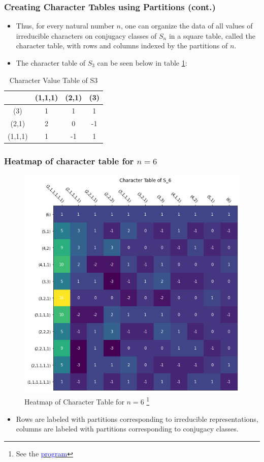 \documentclass{beamer}
\begin{document}
\begin{frame}
\frametitle{Creating Character Tables using Partitions (cont.)}
\begin{itemize}
    \item Thus, for every natural number $n$, one can organize the data of all values of irreducible characters on conjugacy classes of $S_{n}$ in a square table, called the character table, with rows and columns indexed by the partitions of $n$. 
    \item The character table of $S_{3}$ can be seen below in table \ref{tab:s3}:
\end{itemize}

\begin{table}[htbp]
    \centering
    \label{tab:s3}
    \begin{tabular}{c|c c c}
        & (1,1,1) & (2,1) & (3) \\
        \hline
        (3) & 1 & 1 & 1 \\
        (2,1) & 2 & 0 & -1 \\
        (1,1,1) & 1 & -1 & 1 \\
    \end{tabular}
    \caption{Character Value Table of S3}
\end{table}
\end{frame}

\begin{frame}
\frametitle{Heatmap of character table for $n=6$}

\begin{figure}[H]
  \centering
  \includegraphics[width=0.4\linewidth]{char_table_6_heatmap.png}
  \caption{Heatmap of Character Table for $n=6$ 
 \footnote{ \tiny See the \href{https://github.com/TonyZhang2004/Character_Table_of_Symmetric_Groups/blob/main/char_table.ipynb}{\textcolor{blue}{program}}}}
  \label{fig:char_6}
\end{figure}

\begin{itemize}
	\item Rows are labeled with partitions corresponding to irreducible representations, columns are labeled with partitions corresponding to conjugacy classes.
\end{itemize}

\end{frame}
\end{document}
